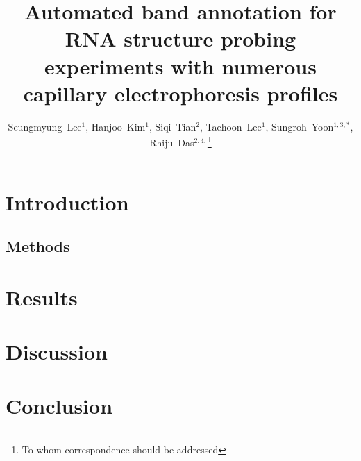 \documentclass[letter]{bioinfo}
\begin{document}

\title[Automated band annotation for capillary electrophoresis]{Automated band annotation for RNA structure probing experiments with numerous capillary electrophoresis profiles}
\author[Lee \textit{et~al}]
{
Seungmyung~Lee$^{1}$,
Hanjoo~Kim$^{1}$,
Siqi~Tian$^{2}$,
Taehoon~Lee$^{1}$,
Sungroh~Yoon$^{1,3,*}$,
Rhiju~Das$^{2,4,}$\footnote{To whom correspondence should be addressed}
}
\address{
$^{1}$Department of ECE, Seoul National University, Seoul 151-744, Korea
$^{2}$Department of Biochemistry, Stanford University School of Medicine, Stanford, CA 94305, USA
$^{3}$Interdisciplinary Program in Bionformatics, Seoul National University, Seoul 151-744, Korea
$^{4}$Department of Physics, Stanford University, Stanford, CA 94305, USA
}

\history{}

\editor{}

\maketitle




\section{Introduction}\label{s:introduction}


\begin{methods}
\section{Methods}\label{s:method}

\end{methods}

\section{Results}\label{s:result}


\section{Discussion}\label{s:discussion}


\section{Conclusion}\label{s:conclusion}

\end{document}
